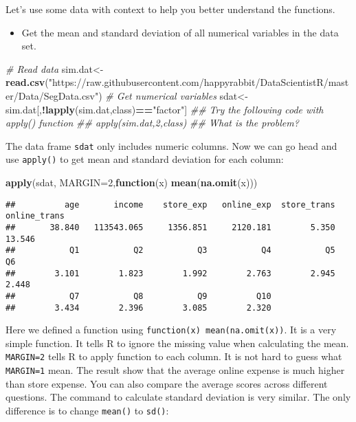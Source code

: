 \documentclass[
]{article}
\newenvironment{Shaded}{\begin{snugshade}}{\end{snugshade}}
\newcommand{\CommentTok}[1]{\textcolor[rgb]{0.56,0.35,0.01}{\textit{#1}}}
\newcommand{\ControlFlowTok}[1]{\textcolor[rgb]{0.13,0.29,0.53}{\textbf{#1}}}
\newcommand{\DataTypeTok}[1]{\textcolor[rgb]{0.13,0.29,0.53}{#1}}
\newcommand{\DecValTok}[1]{\textcolor[rgb]{0.00,0.00,0.81}{#1}}
\newcommand{\KeywordTok}[1]{\textcolor[rgb]{0.13,0.29,0.53}{\textbf{#1}}}
\newcommand{\NormalTok}[1]{#1}
\newcommand{\OperatorTok}[1]{\textcolor[rgb]{0.81,0.36,0.00}{\textbf{#1}}}
\newcommand{\StringTok}[1]{\textcolor[rgb]{0.31,0.60,0.02}{#1}}
\providecommand{\tightlist}{%
  \setlength{\itemsep}{0pt}\setlength{\parskip}{0pt}}
\begin{document}
Let's use some data with context to help you better understand the
functions.

\begin{itemize}
\tightlist
\item
  Get the mean and standard deviation of all numerical variables in the
  data set.
\end{itemize}

\begin{Shaded}
\begin{Highlighting}[]
\CommentTok{# Read data}
\NormalTok{sim.dat<-}\KeywordTok{read.csv}\NormalTok{(}\StringTok{"https://raw.githubusercontent.com/happyrabbit/DataScientistR/master/Data/SegData.csv"}\NormalTok{)}
\CommentTok{# Get numerical variables}
\NormalTok{sdat<-sim.dat[,}\OperatorTok{!}\KeywordTok{lapply}\NormalTok{(sim.dat,class)}\OperatorTok{==}\StringTok{"factor"}\NormalTok{]}
\CommentTok{## Try the following code with apply() function}
\CommentTok{## apply(sim.dat,2,class)}
\CommentTok{## What is the problem?}
\end{Highlighting}
\end{Shaded}

The data frame \texttt{sdat} only includes numeric columns. Now we can
go head and use \texttt{apply()} to get mean and standard deviation for
each column:

\begin{Shaded}
\begin{Highlighting}[]
\KeywordTok{apply}\NormalTok{(sdat, }\DataTypeTok{MARGIN=}\DecValTok{2}\NormalTok{,}\ControlFlowTok{function}\NormalTok{(x) }\KeywordTok{mean}\NormalTok{(}\KeywordTok{na.omit}\NormalTok{(x)))}
\end{Highlighting}
\end{Shaded}

\begin{verbatim}
##          age       income    store_exp   online_exp  store_trans online_trans 
##       38.840   113543.065     1356.851     2120.181        5.350       13.546 
##           Q1           Q2           Q3           Q4           Q5           Q6 
##        3.101        1.823        1.992        2.763        2.945        2.448 
##           Q7           Q8           Q9          Q10 
##        3.434        2.396        3.085        2.320
\end{verbatim}

Here we defined a function using \texttt{function(x)\ mean(na.omit(x))}.
It is a very simple function. It tells R to ignore the missing value
when calculating the mean. \texttt{MARGIN=2} tells R to apply function
to each column. It is not hard to guess what \texttt{MARGIN=1} mean. The
result show that the average online expense is much higher than store
expense. You can also compare the average scores across different
questions. The command to calculate standard deviation is very similar.
The only difference is to change \texttt{mean()} to \texttt{sd()}:
\end{document}
